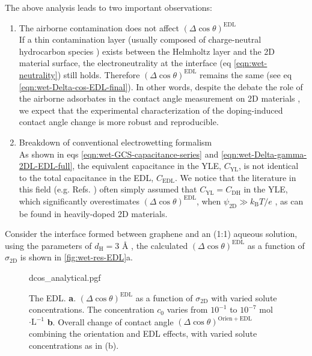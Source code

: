 The above analysis leads to two important observations:
\begin{enumerate}
\item The airborne contamination does not affect \((\Delta \cos
  \theta)^{\mathrm{EDL}}\) \\
  If a thin
contamination layer (usually composed of charge-neutral hydrocarbon
species \cite{li_2013_airborne}) exists between the Helmholtz layer and
the 2D material surface, the electroneutrality at the interface (eq
\autoref{eqn:wet-neutrality}) still holds. Therefore \((\Delta \cos
\theta)^{\mathrm{EDL}}\) remains the same (see eq
\autoref{eqn:wet-Delta-cos-EDL-final}). In other words, despite the
debate the role of the airborne adsorbates in the contact angle
measurement on 2D materials
\cite{li_2013_airborne,Kozbial_2015_wetting_mos2,Xu_2013_withwhat,Chow_2015}, we expect
that the experimental characterization of the doping-induced contact
angle change is more robust and reproducible.

\item Breakdown of conventional electrowetting formalism \\
  As shown in eqs
\autoref{eqn:wet-GCS-capacitance-series} and \autoref{eqn:wet-Delta-gamma-2DL-EDL-full},
the equivalent capacitance in the YLE, \(C_{\mathrm{YL}}\), is not
identical to the total capacitance in the EDL, \(C_{\mathrm{EDL}}\). We
notice that the literature in this field (e.g. Refs.
\cite{Ostrowski_2014_tunable,Daub_2007_nanoscale_EW,goniszewski_correlation_2016,Ashraf_2016_doping})
often simply assumed that \(C_{\mathrm{YL}}=C_{\mathrm{DH}}\) in the
YLE, which significantly overestimates \((\Delta \cos
\theta)^{\mathrm{EDL}}\), when \(\psi_{\mathrm{2D}} \gg
k_{\mathrm{B}}T/e\) \cite{Israelachvili_2011_book}, as can be found in heavily-doped 2D materials. 
\end{enumerate}

Consider the interface formed between graphene and an (1:1) aqueous
solution, using the parameters of \(d_{\mathrm{H}}=3\) Å
\cite{Mcclendon_1927_helmholtz_EDL},
the calculated \((\Delta \cos \theta)^{\mathrm{EDL}}\) as a function
of \(\sigma_{\mathrm{2D}}\) is shown in \autoref{fig:wet-res-EDL}a.
%
\begin{figure}[!htbp]
  \centering
  {dcos_analytical.pgf}
  \caption{\label{fig:wet-res-EDL} The EDL. \textbf{a}.
    \((\Delta\cos\theta)^{\mathrm{EDL}}\) as a function of
    \(\sigma_{\mathrm{2D}}\) with varied solute concentrations. The
    concentration \(c_{0}\) varies from \(10^{-1}\) to \(10^{-7}\)
    mol\(\cdot\mathrm{L}^{-1}\) \textbf{b}. Overall change of contact
    angle \((\Delta \cos \theta)^{\mathrm{Orien+EDL}}\) combining the
    orientation and EDL effects, with varied solute concentrations as
    in (b).}
\end{figure}



